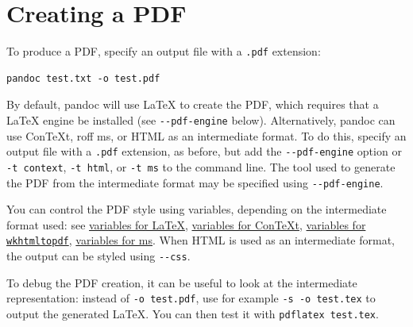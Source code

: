 \documentclass[
  b5paper
]{book}
\begin{document}
\section{Creating a PDF}\label{creating-a-pdf}

To produce a PDF, specify an output file with a \texttt{.pdf} extension:

\begin{verbatim}
pandoc test.txt -o test.pdf
\end{verbatim}

By default, pandoc will use LaTeX to create the PDF, which requires that
a LaTeX engine be installed (see \texttt{-\/-pdf-engine} below).
Alternatively, pandoc can use ConTeXt, roff ms, or HTML as an
intermediate format. To do this, specify an output file with a
\texttt{.pdf} extension, as before, but add the \texttt{-\/-pdf-engine}
option or \texttt{-t\ context}, \texttt{-t\ html}, or \texttt{-t\ ms} to
the command line. The tool used to generate the PDF from the
intermediate format may be specified using \texttt{-\/-pdf-engine}.

You can control the PDF style using variables, depending on the
intermediate format used: see \hyperref[variables-for-latex]{variables
for LaTeX}, \hyperref[variables-for-context]{variables for ConTeXt},
\hyperref[variables-for-wkhtmltopdf]{variables for
\texttt{wkhtmltopdf}}, \hyperref[variables-for-ms]{variables for ms}.
When HTML is used as an intermediate format, the output can be styled
using \texttt{-\/-css}.

To debug the PDF creation, it can be useful to look at the intermediate
representation: instead of \texttt{-o\ test.pdf}, use for example
\texttt{-s\ -o\ test.tex} to output the generated LaTeX. You can then
test it with \texttt{pdflatex\ test.tex}.
\end{document}
